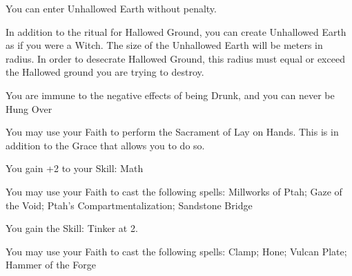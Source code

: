 {\GOD[
Name=Nimlurun,
Link=small-god-nimlurun,
GodOf=Fiend of Filth and Pollution,
Holy=an iron vial of sewer water
]


You can enter Unhallowed Earth without penalty.


In addition to the ritual for Hallowed Ground, you can create Unhallowed Earth as if you were a Witch.  The size of the Unhallowed Earth will be \DICE meters in radius.  In order to desecrate Hallowed Ground, this radius must equal or exceed the Hallowed ground you are trying to destroy.




\GOD[
Name=Ninkasi,
Link=small-god-ninkasi,
GodOf=Seraph of Art; Music; and Fermentation,
Holy=an iron amulet hung from a necklace in the exact size and shape of a modern bottle opener
]


You are immune to the negative effects of being Drunk, and you can never be Hung Over


You may use your Faith to perform the Sacrament of Lay on Hands.  This is in addition to the Grace that allows you to do so.




\GOD[
Name=Ptah,
Link=small-god-ptah,
GodOf=God of Builders,
Holy=an amulet in the shape of an ankh
]


You gain +2 to your Skill: Math


You may use your Faith to cast the following spells: Millworks of Ptah; Gaze of the Void; Ptah's Compartmentalization; Sandstone Bridge







\GOD[
Name=Vulcan,
Link=small-god-vulcan,
GodOf=Seraph of the Forge,
Holy=a small crude homonculous hammered from iron
]


You gain the Skill: Tinker at 2.


You may use your Faith to cast the following spells: Clamp; Hone; Vulcan Plate; Hammer of the Forge

}
